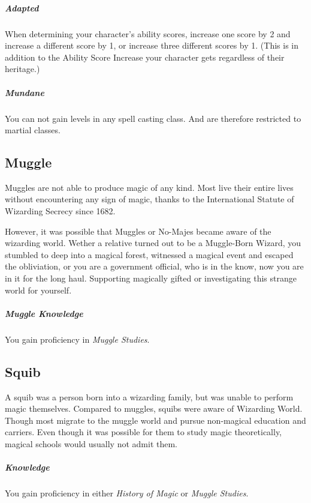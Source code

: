 \documentclass[a4paper,twocolumn,openany,nodeprecatedcode]{dndbook}
\begin{document}
        \subparagraph{Adapted} When determining your character's ability scores, increase one score by 2 and increase a different score by 1, or increase three different scores by 1. (This is in addition to the Ability Score Increase your character gets regardless of their heritage.)

        \subparagraph{Mundane} You can not gain levels in any spell casting class. And are therefore restricted to martial classes.

        \subsection{Muggle}

            Muggles are not able to produce magic of any kind.
            Most live their entire lives without encountering any sign of magic, thanks to the International Statute of Wizarding Secrecy since 1682.

            However, it was possible that Muggles or No-Majes became aware of the wizarding world.
            Wether a relative turned out to be a Muggle-Born Wizard, you stumbled to deep into a magical forest, witnessed a magical event and escaped the obliviation, or you are a government official, who is in the know, now you are in it for the long haul.
            Supporting magically gifted or investigating this strange world for yourself.

            \subparagraph{Muggle Knowledge} You gain proficiency in \textit{Muggle Studies}.

        \subsection{Squib}

            A squib was a person born into a wizarding family, but was unable to perform magic themselves.
            Compared to muggles, squibs were aware of Wizarding World.
            Though most migrate to the muggle world and pursue non-magical education and carriers.
            Even though it was possible for them to study magic theoretically, magical schools would usually not admit them.

            \subparagraph{Knowledge} You gain proficiency in either \textit{History of Magic} or \textit{Muggle Studies}.
\end{document}
